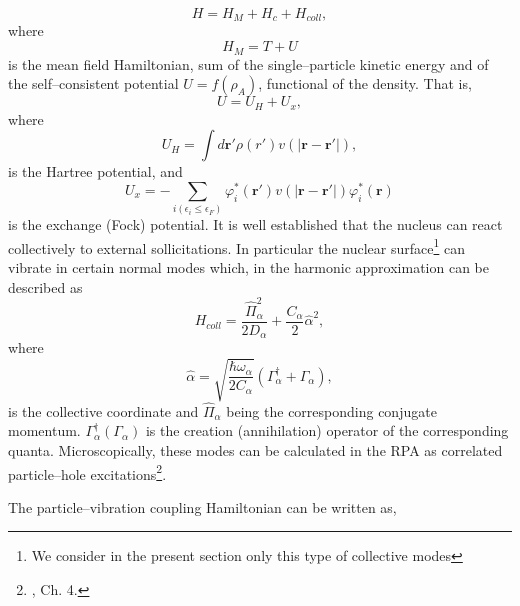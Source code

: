 \begin{equation}\label{eqn:30}
H = H_M + H_{c} + H_{coll} ,
\end{equation}
where
\begin{equation}
H_M=T+U
\end{equation}
is the mean field Hamiltonian, sum of the single--particle kinetic energy and of the self--consistent potential $U=f(\rho_A)$, functional of the  density. That is,
\begin{equation}
U=U_H+U_x,
\end{equation}
where
\begin{equation}
U_H=\int d\mathbf r'\rho(r')v(|\mathbf r- \mathbf r'|),
\end{equation}
is the Hartree potential, and
\begin{equation}
U_x=-\sum_{i(\epsilon_i\leq\epsilon_F)}\varphi_i^*(\mathbf r')v(|\mathbf r- \mathbf r'|)\varphi_i^*(\mathbf r)
\end{equation}
is the exchange (Fock) potential. It is well established that the nucleus can react collectively to external sollicitations. In particular the nuclear surface\footnote{We consider in the present section only this type of collective modes} can vibrate in certain normal modes which, in the harmonic approximation can be described as
 \begin{equation}
H_{coll}=\frac{\hat\Pi_\alpha^2}{2D_\alpha}+\frac{C_\alpha}{2}\hat\alpha^2,
 \end{equation}
 where 
 \begin{equation}
\hat\alpha=\sqrt{\frac{\hbar \omega_\alpha}{2C_\alpha}}\left(\Gamma^\dagger_\alpha+\Gamma_\alpha\right),
 \end{equation}
 is the collective coordinate and $\hat\Pi_\alpha$ being the corresponding conjugate momentum.  $\Gamma^\dagger_\alpha(\Gamma_\alpha)$ is the creation (annihilation) operator of the corresponding quanta. Microscopically, these modes can be calculated in the RPA as correlated particle--hole excitations\footnote{\cite{Bohm:51,Bohm:52,Bohm:53,Bertsch:05}, Ch. 4.}.
 
 
 
The particle--vibration coupling Hamiltonian can be written as,

